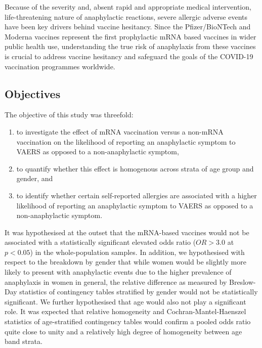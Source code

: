 \documentclass{article}
\begin{document}
Because of the severity and, absent rapid and appropriate medical intervention, life-threatening nature of anaphylactic reactions, severe allergic adverse events have been key drivers behind vaccine hesitancy.\cite{tulloch2021covid,marcec2021postvaccination,jacobson2015vaccine}
Since the Pfizer/BioNTech and Moderna vaccines represent the first prophylactic mRNA based vaccines in wider public health use, understanding the true risk of anaphylaxis from these vaccines is crucial to address vaccine hesitancy and safeguard the goals of the COVID-19 vaccination programmes worldwide.

\subsection{Objectives}\label{subsec:objectives}

The objective of this study was threefold:

\begin{enumerate}
    \item to investigate the effect of mRNA vaccination versus a non-mRNA vaccination on the likelihood of reporting an anaphylactic symptom to VAERS as opposed to a non-anaphylactic symptom,
    \item to quantify whether this effect is homogenous across strata of age group and gender, and
    \item to identify whether certain self-reported allergies are associated with a higher likelihood of reporting an anaphylactic symptom to VAERS as opposed to a non-anaphylactic symptom.
\end{enumerate}

It was hypothesised at the outset that the mRNA-based vaccines would not be associated with a statistically significant elevated odds ratio ($OR > 3.0$ at $p < 0.05$) in the whole-population samples.
In addition, we hypothesised with respect to the breakdown by gender that while women would be slightly more likely to present with anaphylactic events due to the higher prevalence of anaphylaxis in women in general,\cite{salvati2019gender} the relative difference as measured by Breslow-Day statistics of contingency tables stratified by gender would not be statistically significant.
We further hypothesised that age would also not play a significant role.
It was expected that relative homogeneity and Cochran-Mantel-Haenszel statistics of age-stratified contingency tables would confirm a pooled odds ratio quite close to unity and a relatively high degree of homogeneity between age band strata.
\end{document}
